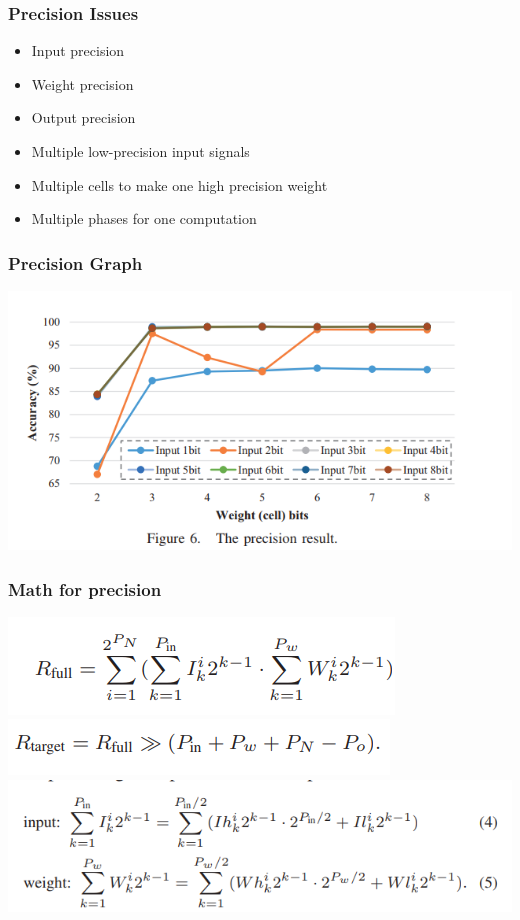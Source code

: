 \documentclass[hyperref={colorlinks}]{beamer}
\begin{document}
\begin{frame}
	\frametitle{Precision Issues}
	\begin{itemize}
		\item Input precision
		\item Weight precision
		\item Output precision
	\end{itemize}
	\begin{itemize}
		\item Multiple low-precision input signals
		\item Multiple cells to make one high precision weight
		\item Multiple phases for one computation
	\end{itemize}
\end{frame}
\begin{frame}
	\frametitle{Precision Graph}
	\includegraphics[scale=0.4]{precision_graph.png}
\end{frame}
\begin{frame}
	\frametitle{Math for precision}
	\begin{center}
		\includegraphics[scale=0.4]{math0.png}
		\\
		\includegraphics[scale=0.4]{target.png}
		\\
		\includegraphics[scale=0.4]{split_in_weights.png}
	\end{center}
\end{frame}
\end{document}
